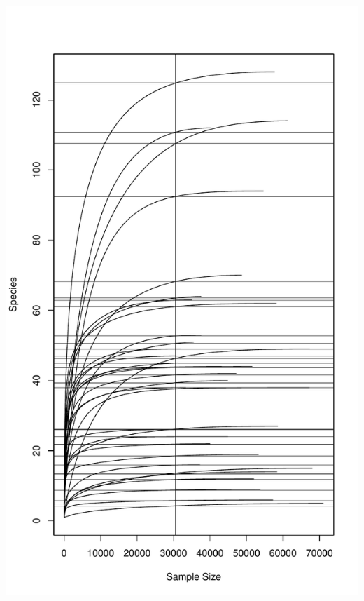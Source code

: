 \documentclass[
]{article}
\begin{document}
\includegraphics[width=1\linewidth]{manuscript_template_files/figure-latex/unnamed-chunk-20-3}
\end{document}
